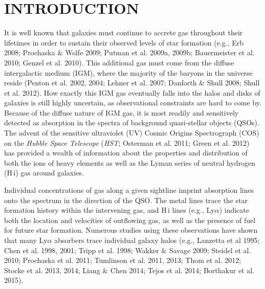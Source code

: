 

\section{INTRODUCTION}

It is well known that galaxies must continue to accrete gas throughout their lifetimes in order to sustain their observed levels of star formation (e.g., Erb 2008; Prochaska $\&$ Wolfe 2009; Putman et al. 2009a, 2009b; Bauermeister et al. 2010; Genzel et al. 2010). This additional gas must come from the diffuse intergalactic medium (IGM), where the majority of the baryons in the universe reside (Penton et al. 2002, 2004; Lehner et al. 2007; Danforth $\&$ Shull 2008; Shull et al. 2012). How exactly this IGM gas eventually falls into the halos and disks of galaxies is still highly uncertain, as observational constraints are hard to come by. Because of the diffuse nature of IGM gas, it is most readily and sensitively detected as absorption in the spectra of background quasi-stellar objects (QSOs). The advent of the sensitive ultraviolet (UV) Cosmic Origins Spectrograph (COS) on the \textit{Hubble Space Telescope} (\textit{HST}; Osterman et al. 2011; Green et al. 2012) has provided a wealth of information about the properties and distribution of both the ions of heavy elements as well as the Lyman series of neutral hydrogen (H\,{\sc i}) gas around galaxies. 

Individual concentrations of gas along a given sightline imprint absorption lines onto the spectrum in the direction of the QSO. The metal lines trace the star formation history within the intervening gas, and H\,{\sc i} lines (e.g., Ly$\alpha$) indicate both the location and velocities of outflowing gas, as well as the presence of fuel for future star formation. Numerous studies using these observations have shown that many Ly$\alpha$ absorbers trace individual galaxy halos (e.g., Lanzetta et al 1995; Chen et al. 1998, 2001; Tripp et al. 1998; Wakker $\&$ Savage 2009; Steidel et al. 2010; Prochaska et al. 2011; Tumlinson et al. 2011, 2013; Thom et al. 2012;  Stocke et al. 2013, 2014; Liang $\&$ Chen 2014; Tejos et al. 2014; Borthakur et al. 2015).

